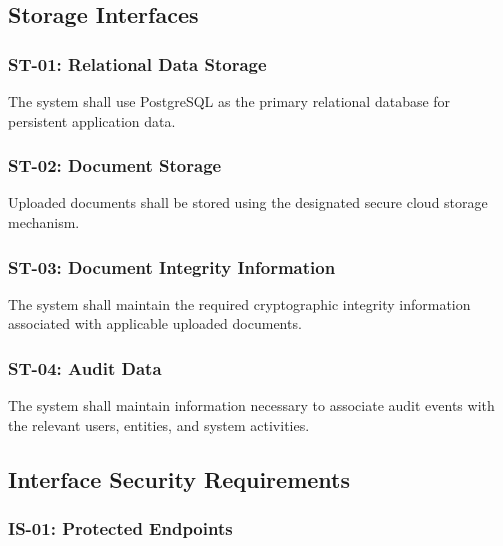 
\subsection{Storage Interfaces}

\subsubsection{ST-01: Relational Data Storage}

The system shall use PostgreSQL as the primary relational database for
persistent application data.

\subsubsection{ST-02: Document Storage}

Uploaded documents shall be stored using the designated secure cloud
storage mechanism.

\subsubsection{ST-03: Document Integrity Information}

The system shall maintain the required cryptographic integrity information
associated with applicable uploaded documents.

\subsubsection{ST-04: Audit Data}

The system shall maintain information necessary to associate audit events
with the relevant users, entities, and system activities.



\subsection{Interface Security Requirements}

\subsubsection{IS-01: Protected Endpoints}

